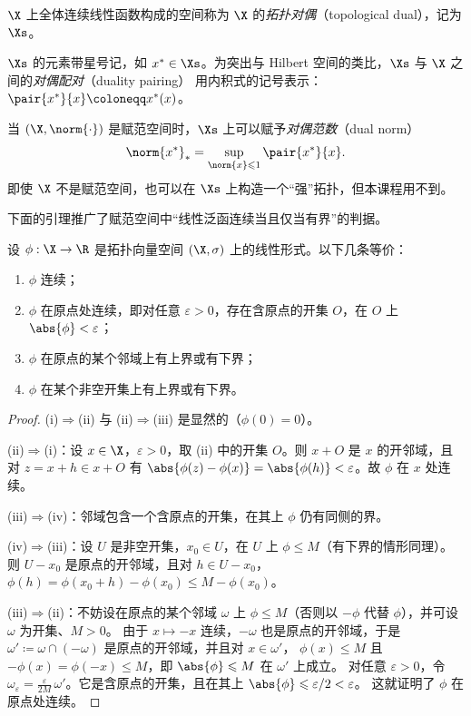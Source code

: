 \begin{definition}[对偶空间]
\label{def:36}
$\X$ 上全体连续线性函数构成的空间称为 $\X$ 的\emph{拓扑对偶}（topological dual），记为 $\Xs$。
\end{definition}

$\Xs$ 的元素带星号记，如 $x^*\in\Xs$。为突出与 Hilbert 空间的类比，$\Xs$ 与 $\X$ 之间的\emph{对偶配对}（duality pairing）
用内积式的记号表示：$\pair{x^*}{x}\coloneqq x^*(x)$。

\begin{remark}
\label{rem:25}
当 $(\X,\norm{\cdot})$ 是赋范空间时，$\Xs$ 上可以赋予\emph{对偶范数}（dual norm）
\[
  \norm{x^*}_*=\sup_{\norm{x}\leqslant1}\pair{x^*}{x}.
\]
即使 $\X$ 不是赋范空间，也可以在 $\Xs$ 上构造一个“强”拓扑，但本课程用不到。
\end{remark}

下面的引理推广了赋范空间中“线性泛函连续当且仅当有界”的判据。

\begin{lemma}[连续线性形式的刻画]
\label{res:70}
设 $\phi:\X\to\R$ 是拓扑向量空间 $(\X,\sigma)$ 上的线性形式。以下几条等价：
\begin{enumerate}[label=(\roman*)]
  \item $\phi$ 连续；
  \item $\phi$ 在原点处连续，即对任意 $\varepsilon>0$，存在含原点的开集 $O$，在 $O$ 上 $\abs{\phi}<\varepsilon$；
  \item $\phi$ 在原点的某个邻域上有上界或有下界；
  \item $\phi$ 在某个非空开集上有上界或有下界。
\end{enumerate}
\end{lemma}

\begin{proof}
(i)$\Rightarrow$(ii) 与 (ii)$\Rightarrow$(iii) 是显然的（$\phi(0)=0$）。

(ii)$\Rightarrow$(i)：设 $x\in\X$，$\varepsilon>0$，取 (ii) 中的开集 $O$。则 $x+O$ 是 $x$ 的开邻域，且对 $z=x+h\in x+O$ 有
$\abs{\phi(z)-\phi(x)}=\abs{\phi(h)}<\varepsilon$。故 $\phi$ 在 $x$ 处连续。

(iii)$\Rightarrow$(iv)：邻域包含一个含原点的开集，在其上 $\phi$ 仍有同侧的界。

(iv)$\Rightarrow$(iii)：设 $U$ 是非空开集，$x_0\in U$，在 $U$ 上 $\phi\leqslant M$（有下界的情形同理）。
则 $U-x_0$ 是原点的开邻域，且对 $h\in U-x_0$，$\phi(h)=\phi(x_0+h)-\phi(x_0)\leqslant M-\phi(x_0)$。

(iii)$\Rightarrow$(ii)：不妨设在原点的某个邻域 $\omega$ 上 $\phi\leqslant M$（否则以 $-\phi$ 代替 $\phi$），并可设 $\omega$ 为开集、$M>0$。
由于 $x\mapsto-x$ 连续，$-\omega$ 也是原点的开邻域，于是 $\omega'\coloneqq\omega\cap(-\omega)$ 是原点的开邻域，并且对 $x\in\omega'$，
$\phi(x)\leqslant M$ 且 $-\phi(x)=\phi(-x)\leqslant M$，即 $\abs{\phi}\leqslant M$ 在 $\omega'$ 上成立。
对任意 $\varepsilon>0$，令 $\omega_\varepsilon=\frac{\varepsilon}{2M}\,\omega'$。它是含原点的开集，且在其上 $\abs{\phi}\leqslant\varepsilon/2<\varepsilon$。
这就证明了 $\phi$ 在原点处连续。
\end{proof}

